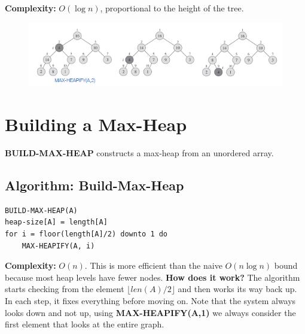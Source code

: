 \textbf{Complexity:} \( O(\log n) \), proportional to the height of the tree.
\begin{figure}[h!]
    \centering
    \includegraphics[width=1\linewidth]{immagini/heap3.png}
\end{figure}
\section{Building a Max-Heap}
\textbf{BUILD-MAX-HEAP} constructs a max-heap from an unordered array.

\subsection{Algorithm: Build-Max-Heap}
\begin{verbatim}
BUILD-MAX-HEAP(A)
heap-size[A] = length[A]
for i = floor(length[A]/2) downto 1 do
    MAX-HEAPIFY(A, i)
\end{verbatim}
\textbf{Complexity:} \( O(n) \). This is more efficient than the naive \( O(n \log n) \) bound because most heap levels have fewer nodes. \newline
\textbf{How does it work?} The algorithm starts checking from the element $\lfloor len(A)/2 \rfloor$ and then works its way back up. In each step, it fixes everything before moving on. Note that the system always looks down and not up, using \textbf{MAX-HEAPIFY(A,1)} we always consider the first element that looks at the entire graph.
